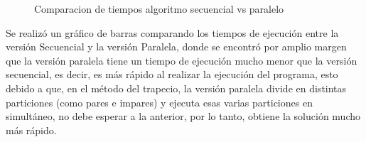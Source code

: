 \documentclass[12pt, letterpaper]{article}
\begin{document}
\begin{flushleft}
\begin{figure}[H]
        \caption{Comparacion de tiempos algoritmo secuencial vs paralelo}
    \end{figure}
    Se realizó un gráfico de barras comparando los tiempos de ejecución entre la versión Secuencial y la versión Paralela, donde se encontró por amplio margen que la versión paralela tiene un tiempo de ejecución mucho menor que la versión secuencial, es decir, es más rápido al realizar la ejecución del programa, esto debido a que, en el método del trapecio, la versión paralela divide en distintas particiones (como pares e impares) y ejecuta esas varias particiones en simultáneo, no debe esperar a la anterior, por lo tanto, obtiene la solución mucho más rápido.
\end{flushleft}
\end{document}

